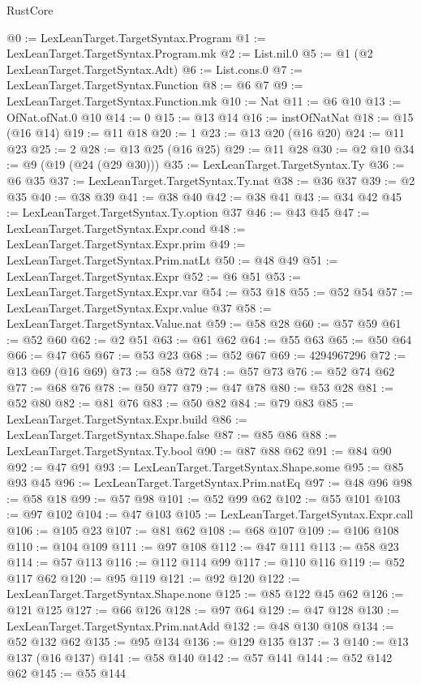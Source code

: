 \begin{lexlean}{RustCore}
\begin{coremodule}
@0 := LexLeanTarget.TargetSyntax.Program
@1 := LexLeanTarget.TargetSyntax.Program.mk
@2 := List.nil.{0}
@5 := @1 (@2 LexLeanTarget.TargetSyntax.Adt)
@6 := List.cons.{0}
@7 := LexLeanTarget.TargetSyntax.Function
@8 := @6 @7
@9 := LexLeanTarget.TargetSyntax.Function.mk
@10 := Nat
@11 := @6 @10
@13 := OfNat.ofNat.{0} @10
@14 := 0
@15 := @13 @14
@16 := instOfNatNat
@18 := @15 (@16 @14)
@19 := @11 @18
@20 := 1
@23 := @13 @20 (@16 @20)
@24 := @11 @23
@25 := 2
@28 := @13 @25 (@16 @25)
@29 := @11 @28
@30 := @2 @10
@34 := @9 (@19 (@24 (@29 @30)))
@35 := LexLeanTarget.TargetSyntax.Ty
@36 := @6 @35
@37 := LexLeanTarget.TargetSyntax.Ty.nat
@38 := @36 @37
@39 := @2 @35
@40 := @38 @39
@41 := @38 @40
@42 := @38 @41
@43 := @34 @42
@45 := LexLeanTarget.TargetSyntax.Ty.option @37
@46 := @43 @45
@47 := LexLeanTarget.TargetSyntax.Expr.cond
@48 := LexLeanTarget.TargetSyntax.Expr.prim
@49 := LexLeanTarget.TargetSyntax.Prim.natLt
@50 := @48 @49
@51 := LexLeanTarget.TargetSyntax.Expr
@52 := @6 @51
@53 := LexLeanTarget.TargetSyntax.Expr.var
@54 := @53 @18
@55 := @52 @54
@57 := LexLeanTarget.TargetSyntax.Expr.value @37
@58 := LexLeanTarget.TargetSyntax.Value.nat
@59 := @58 @28
@60 := @57 @59
@61 := @52 @60
@62 := @2 @51
@63 := @61 @62
@64 := @55 @63
@65 := @50 @64
@66 := @47 @65
@67 := @53 @23
@68 := @52 @67
@69 := 4294967296
@72 := @13 @69 (@16 @69)
@73 := @58 @72
@74 := @57 @73
@76 := @52 @74 @62
@77 := @68 @76
@78 := @50 @77
@79 := @47 @78
@80 := @53 @28
@81 := @52 @80
@82 := @81 @76
@83 := @50 @82
@84 := @79 @83
@85 := LexLeanTarget.TargetSyntax.Expr.build
@86 := LexLeanTarget.TargetSyntax.Shape.false
@87 := @85 @86
@88 := LexLeanTarget.TargetSyntax.Ty.bool
@90 := @87 @88 @62
@91 := @84 @90
@92 := @47 @91
@93 := LexLeanTarget.TargetSyntax.Shape.some
@95 := @85 @93 @45
@96 := LexLeanTarget.TargetSyntax.Prim.natEq
@97 := @48 @96
@98 := @58 @18
@99 := @57 @98
@101 := @52 @99 @62
@102 := @55 @101
@103 := @97 @102
@104 := @47 @103
@105 := LexLeanTarget.TargetSyntax.Expr.call
@106 := @105 @23
@107 := @81 @62
@108 := @68 @107
@109 := @106 @108
@110 := @104 @109
@111 := @97 @108
@112 := @47 @111
@113 := @58 @23
@114 := @57 @113
@116 := @112 @114 @99
@117 := @110 @116
@119 := @52 @117 @62
@120 := @95 @119
@121 := @92 @120
@122 := LexLeanTarget.TargetSyntax.Shape.none
@125 := @85 @122 @45 @62
@126 := @121 @125
@127 := @66 @126
@128 := @97 @64
@129 := @47 @128
@130 := LexLeanTarget.TargetSyntax.Prim.natAdd
@132 := @48 @130 @108
@134 := @52 @132 @62
@135 := @95 @134
@136 := @129 @135
@137 := 3
@140 := @13 @137 (@16 @137)
@141 := @58 @140
@142 := @57 @141
@144 := @52 @142 @62
@145 := @55 @144

\end{coremodule}
\end{lexlean}
